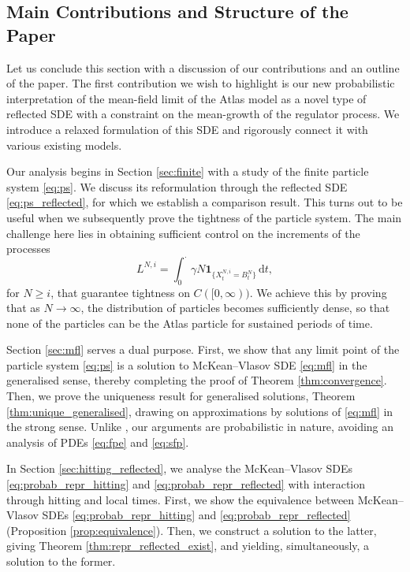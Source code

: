 \documentclass[11pt, a4paper]{article}
\theoremstyle{plain}
\theoremstyle{definition}
\theoremstyle{remark}
\numberwithin{equation}{section}
\renewcommand{\d}{\mathrm{d}}
\renewcommand{\bf}[1]{\mathbf{#1}}
\begin{document}
\subsection{Main Contributions and Structure of the Paper}

Let us conclude this section with a discussion of our contributions and an outline of the paper. The first contribution we wish to highlight is our new probabilistic interpretation of the mean-field limit of the Atlas model as a novel type of reflected SDE with a constraint on the mean-growth of the regulator process. We introduce a relaxed formulation of this SDE and rigorously connect it with various existing models.

Our analysis begins in Section \ref{sec:finite} with a study of the finite particle system \eqref{eq:ps}. We discuss its reformulation through the reflected SDE \eqref{eq:ps_reflected}, for which we establish a comparison result. This turns out to be useful when we subsequently prove the tightness of the particle system. The main challenge here lies in obtaining sufficient control on the increments of the processes
\begin{equation*}
    L^{N, i} = \int_0^{\cdot} \gamma N \bf{1}_{\{X^{N, i}_t = B^N_t\}} \, \d t,
\end{equation*}
for $N \geq i$, that guarantee tightness on $C([0, \infty))$. We achieve this by proving that as $N \to \infty$, the distribution of particles becomes sufficiently dense, so that none of the particles can be the Atlas particle for sustained periods of time.

Section \ref{sec:mfl} serves a dual purpose. First, we show that any limit point of the particle system \eqref{eq:ps} is a solution to McKean--Vlasov SDE \eqref{eq:mfl} in the generalised sense, thereby completing the proof of Theorem \ref{thm:convergence}. Then, we prove the uniqueness result for generalised solutions, Theorem \ref{thm:unique_generalised}, drawing on approximations by solutions of \eqref{eq:mfl} in the strong sense. Unlike \cite{atar_atlas_2025}, our arguments are probabilistic in nature, avoiding an analysis of PDEs \eqref{eq:fpe} and \eqref{eq:sfp}.

In Section \ref{sec:hitting_reflected}, we analyse the McKean--Vlasov SDEs \eqref{eq:probab_repr_hitting} and \eqref{eq:probab_repr_reflected} with interaction through hitting and local times. First, we show the equivalence between McKean--Vlasov SDEs \eqref{eq:probab_repr_hitting} and \eqref{eq:probab_repr_reflected} (Proposition \ref{prop:equivalence}). Then, we construct a solution to the latter, giving Theorem \ref{thm:repr_reflected_exist}, and yielding, simultaneously, a solution to the former.
\end{document}
